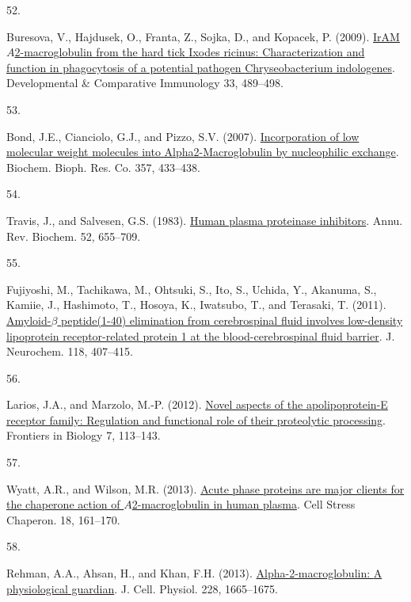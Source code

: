 \documentclass[
]{article}
\newlength{\cslhangindent}
\newlength{\csllabelwidth}
\newlength{\cslentryspacingunit} %
\newenvironment{CSLReferences}[2] %
 {%
  \setlength{\parindent}{0pt}
  \ifodd #1
  \let\oldpar\par
  \def\par{\hangindent=\cslhangindent\oldpar}
  \fi
  \setlength{\parskip}{#2\cslentryspacingunit}
 }%
 {}
\newcommand{\CSLLeftMargin}[1]{\parbox[t]{\csllabelwidth}{#1}}
\newcommand{\CSLRightInline}[1]{\parbox[t]{\linewidth - \csllabelwidth}{#1}\break}
\begin{document}
\begin{CSLReferences}{0}{0}
\leavevmode{}%
\CSLLeftMargin{52. }
\CSLRightInline{Buresova, V., Hajdusek, O., Franta, Z., Sojka, D., and Kopacek, P. (2009). \href{https://doi.org/10.1016/j.dci.2008.09.011}{{IrAM}\textemdash{{An}} {\(A\)}2-macroglobulin from the hard tick {Ixodes} ricinus: {Characterization} and function in phagocytosis of a potential pathogen {Chryseobacterium} indologenes}. Developmental \& Comparative Immunology 33, 489--498.}

\leavevmode{}%
\CSLLeftMargin{53. }
\CSLRightInline{Bond, J.E., Cianciolo, G.J., and Pizzo, S.V. (2007). \href{https://doi.org/10.1016/j.bbrc.2007.03.151}{Incorporation of low molecular weight molecules into Alpha2-{Macroglobulin} by nucleophilic exchange}. Biochem. Bioph. Res. Co. 357, 433--438.}

\leavevmode{}%
\CSLLeftMargin{54. }
\CSLRightInline{Travis, J., and Salvesen, G.S. (1983). \href{https://doi.org/10.1146/annurev.bi.52.070183.003255}{Human plasma proteinase inhibitors}. Annu. Rev. Biochem. 52, 655--709.}

\leavevmode{}%
\CSLLeftMargin{55. }
\CSLRightInline{Fujiyoshi, M., Tachikawa, M., Ohtsuki, S., Ito, S., Uchida, Y., Akanuma, S., Kamiie, J., Hashimoto, T., Hosoya, K., Iwatsubo, T., and Terasaki, T. (2011). \href{https://doi.org/10.1111/j.1471-4159.2011.07311.x}{Amyloid-{\(\beta\)} peptide(1-40) elimination from cerebrospinal fluid involves low-density lipoprotein receptor-related protein 1 at the blood-cerebrospinal fluid barrier}. J. Neurochem. 118, 407--415.}

\leavevmode{}%
\CSLLeftMargin{56. }
\CSLRightInline{Larios, J.A., and Marzolo, M.-P. (2012). \href{https://doi.org/10.1007/s11515-011-1186-7}{Novel aspects of the apolipoprotein-{E} receptor family: Regulation and functional role of their proteolytic processing}. Frontiers in Biology 7, 113--143.}

\leavevmode{}%
\CSLLeftMargin{57. }
\CSLRightInline{Wyatt, A.R., and Wilson, M.R. (2013). \href{https://doi.org/10.1007/s12192-012-0365-z}{Acute phase proteins are major clients for the chaperone action of {\(A\)}2-macroglobulin in human plasma}. Cell Stress Chaperon. 18, 161--170.}

\leavevmode{}%
\CSLLeftMargin{58. }
\CSLRightInline{Rehman, A.A., Ahsan, H., and Khan, F.H. (2013). \href{https://doi.org/10.1002/jcp.24266}{Alpha-2-macroglobulin: {A} physiological guardian}. J. Cell. Physiol. 228, 1665--1675.}


\end{CSLReferences}
\end{document}
